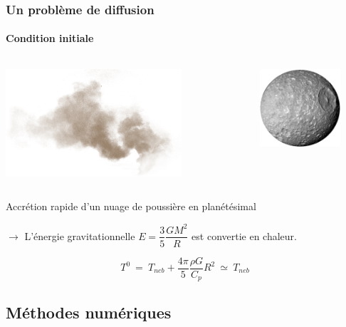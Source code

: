 \documentclass{beamer}
\begin{document}
\begin{frame}
	\frametitle{Un problème de diffusion}
	\framesubtitle{Condition initiale}

\vspace{-1cm}

\begin{columns}
    \begin{column}{7cm}      
	  \center \includegraphics[height = 4cm]{figures/dust.png}  
	\end{column}
	
	\begin{column}{1cm}      
	  \center {\huge $\Rightarrow$}  
	\end{column}

	\begin{column}{5cm}     
      \center \includegraphics[width = 3cm]{figures/mimas.png}
      \vspace{-0.4cm}
	\end{column}
\end{columns}

\center
Accrétion rapide d'un nuage de poussière en planétésimal
\vspace{0.5cm}

$\rightarrow$ L'énergie gravitationnelle $ E = \dfrac{3}{5} \dfrac{GM^2}{R}$ est convertie en chaleur.

$$T^0 \ =\  T_{neb} + \frac{4\pi}{5}\frac{\rho G}{C_p} R^2 \  \simeq \ T_{neb}$$

\end{frame}

\subsection{Méthodes numériques}
\end{document}
